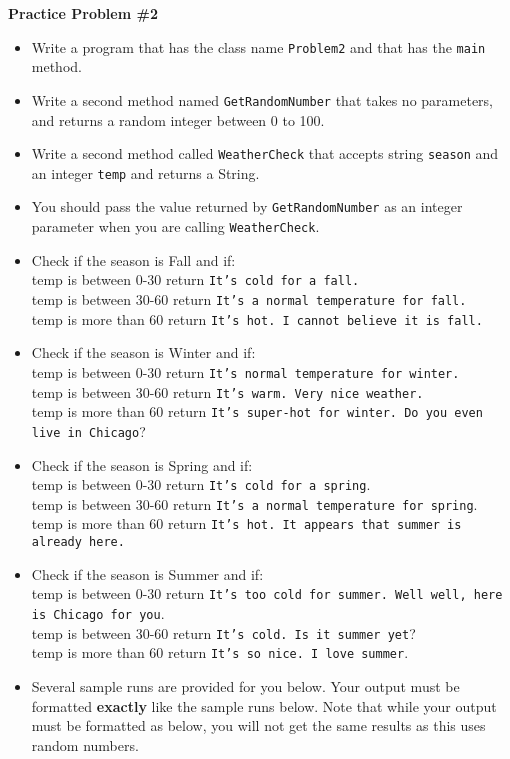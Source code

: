 \documentclass[12pt]{article}
\begin{document}
\vspace*{0.5cm}
\noindent\textbf{Practice Problem \#2}
\begin{itemize}
	\item Write a program that has the class name \texttt{Problem2} and that has the \texttt{main} method.
	\item Write a second method named \texttt{GetRandomNumber} that takes no parameters, and returns a random integer between 0 to 100.
	\item Write a second method called \texttt{WeatherCheck} that accepts string \texttt{season} and  an integer \texttt{temp} and returns a String.
	\item You should pass the value returned by \texttt{GetRandomNumber} as an integer parameter when you are calling \texttt{WeatherCheck}.
	\item Check if the season is Fall and if:\\
	temp is between 0-30 return \texttt{It's cold for a fall.}\\
	temp is between 30-60 return \texttt{It's a normal temperature for fall.}\\
	temp is more than 60 return \texttt{It's hot. I cannot believe it is fall.}\\

	\item Check if the season is Winter and if:\\
	temp is between 0-30 return \texttt{It's normal temperature for winter.}\\
	temp is between 30-60 return \texttt{It's warm. Very nice weather.}\\
	temp is more than 60 return \texttt{It's super-hot for winter. Do you even live in Chicago}?\\

	\item Check if the season is Spring and if:\\
	temp is between 0-30 return \texttt{It's cold for a spring}.\\
	temp is between 30-60 return \texttt{It's a normal temperature for spring}.\\
	temp is more than 60 return \texttt{It's hot. It appears that summer is already here.}\\

	\item Check if the season is Summer and if:\\
	temp is between 0-30 return \texttt{It's too cold for summer. Well well, here is Chicago for you}.\\
	temp is between 30-60 return \texttt{It's cold. Is it summer yet}?\\
	temp is more than 60 return \texttt{It's so nice. I love summer}.\\
	\item Several sample runs are provided for you below. Your output must be formatted \textbf{exactly} like the sample runs below. Note that while your output must be formatted as below, you will not get the same results as this uses random numbers.

\end{itemize}
\end{document}

